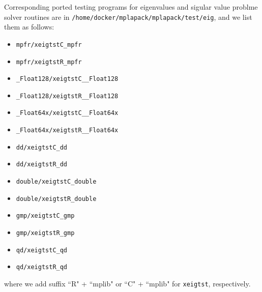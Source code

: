 \documentclass[12pt]{article}
\begin{document}
Corresponding ported testing programs for eigenvalues and sigular value problme solver
routines are in {\tt /home/docker/mplapack/mplapack/test/eig}, and we list them as follows:
\begin{itemize}
\item {\tt mpfr/xeigtstC\_mpfr}
\item {\tt mpfr/xeigtstR\_mpfr}
\item {\tt \_Float128/xeigtstC\_\_Float128}
\item {\tt \_Float128/xeigtstR\_\_Float128}
\item {\tt \_Float64x/xeigtstC\_\_Float64x}
\item {\tt \_Float64x/xeigtstR\_\_Float64x}
\item {\tt dd/xeigtstC\_dd}
\item {\tt dd/xeigtstR\_dd}
\item {\tt double/xeigtstC\_double}
\item {\tt double/xeigtstR\_double}
\item {\tt gmp/xeigtstC\_gmp}
\item {\tt gmp/xeigtstR\_gmp}
\item {\tt qd/xeigtstC\_qd}
\item {\tt qd/xeigtstR\_qd}
\end{itemize}
where we add suffix ``R" + ``mplib" or ``C" + ``mplib" for {\tt xeigtst}, respectively.
\end{document}
